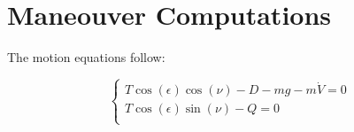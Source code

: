 \section*{Maneouver Computations}
The motion equations follow:

\begin{equation}
	\begin{cases}
	T\cos(\epsilon)\cos(\nu) - D -mg-m\dot{V}=0\\
	T\cos(\epsilon)\sin(\nu) - Q=0\\
		\end{cases}
\end{equation}